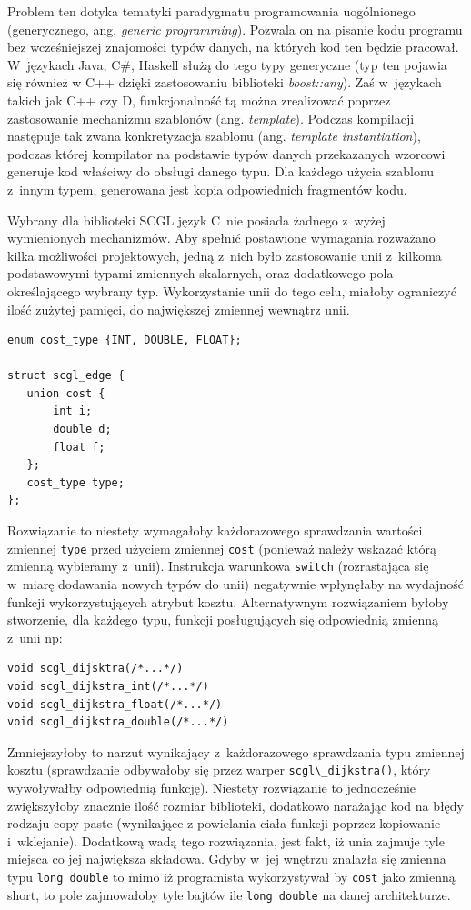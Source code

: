 \documentclass[a4paper,12pt,polish,oneside]{thesis}
\newcommand\code[1]{\lstinline[style=line]{#1}}
\begin{document}
Problem ten dotyka tematyki paradygmatu programowania uogólnionego (generycznego, ang, \emph{generic programming}).
Pozwala on na pisanie kodu programu bez wcześniejszej znajomości typów danych, na których kod ten będzie pracował.
W~językach Java, C\#, Haskell służą do tego typy generyczne (typ ten pojawia się również w C++ dzięki zastosowaniu biblioteki \emph{boost::any}).
Zaś w~językach takich jak C++ czy D, funkcjonalność tą można zrealizować poprzez zastosowanie mechanizmu szablonów (ang. \emph{template}).
Podczas kompilacji następuje tak zwana konkretyzacja szablonu (ang. \emph{template instantiation}), podczas której kompilator na podstawie typów danych przekazanych wzorcowi generuje kod właściwy do obsługi danego typu.
Dla każdego użycia szablonu z~innym typem, generowana jest kopia odpowiednich fragmentów kodu.

Wybrany dla biblioteki SCGL język C~nie posiada żadnego z~wyżej wymienionych mechanizmów.
Aby spełnić postawione wymagania rozważano kilka możliwości projektowych, jedną z~nich było zastosowanie unii z~kilkoma podstawowymi typami zmiennych skalarnych, oraz dodatkowego pola określającego wybrany typ.
Wykorzystanie unii do tego celu, miałoby ograniczyć ilość zużytej pamięci, do największej zmiennej wewnątrz unii.
\begin{lstlisting}[style=code,caption=Koszt krawędzi jako unia]
enum cost_type {INT, DOUBLE, FLOAT};

struct scgl_edge {
   union cost {
       int i;
       double d;
       float f;
   };
   cost_type type;
};
\end{lstlisting}
Rozwiązanie to niestety wymagałoby każdorazowego sprawdzania wartości zmiennej \code{type} przed użyciem zmiennej \code{cost} (ponieważ należy wskazać którą zmienną wybieramy z~unii).
Instrukcja warunkowa \code{switch} (rozrastająca się w~miarę dodawania nowych typów do unii) negatywnie wpłynęłaby na wydajność funkcji wykorzystujących atrybut kosztu.
Alternatywnym rozwiązaniem byłoby stworzenie, dla każdego typu, funkcji posługujących się odpowiednią zmienną z~unii np:
\begin{lstlisting}[style=coden]
void scgl_dijsktra(/*...*/)
void scgl_dijkstra_int(/*...*/)
void scgl_dijkstra_float(/*...*/)
void scgl_dijkstra_double(/*...*/)
\end{lstlisting}
Zmniejszyłoby to narzut wynikający z~każdorazowego sprawdzania typu zmiennej kosztu (sprawdzanie odbywałoby się przez warper \code{scgl\_dijkstra()}, który wywoływałby odpowiednią funkcję).
Niestety rozwiązanie to jednocześnie zwiększyłoby znacznie ilość rozmiar biblioteki, dodatkowo narażając kod na błędy rodzaju copy-paste (wynikające z powielania ciała funkcji poprzez kopiowanie i~wklejanie).
Dodatkową wadą tego rozwiązania, jest fakt, iż unia zajmuje tyle miejsca co jej największa składowa. Gdyby w~jej wnętrzu znalazła się zmienna typu \code{long double} to mimo iż programista wykorzystywał by \code{cost} jako zmienną short, to pole zajmowałoby tyle bajtów ile \code{long double} na danej architekturze.
\end{document}
